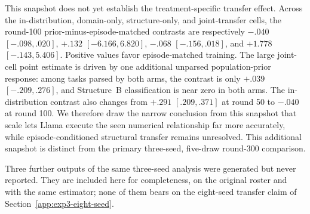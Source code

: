 This snapshot does not yet establish the treatment-specific transfer effect.
Across the in-distribution, domain-only, structure-only, and joint-transfer
cells, the round-100 prior-minus-episode-matched contrasts are respectively
$-.040$ $[-.098,.020]$, $+.132$ $[-6.166,6.820]$, $-.068$
$[-.156,.018]$, and $+1.778$ $[-.143,5.406]$. Positive values favor
episode-matched training. The large joint-cell point estimate is driven by one
additional unparsed population-prior response: among tasks parsed by both arms,
the contrast is only $+.039$ $[-.209,.276]$, and Structure~B classification is
near zero in both arms. The in-distribution contrast also changes from $+.291$
$[.209,.371]$ at round 50 to $-.040$ at round 100. We therefore draw the
narrow conclusion from this snapshot that scale lets Llama execute the seen numerical
relationship far more accurately, while episode-conditioned structural
transfer remains unresolved. This additional snapshot is distinct from
the primary three-seed, five-draw round-300 comparison.

\begin{center}
\begin{minipage}{\linewidth}
\centering
{}
\label{tab:exp3-coin-complete-roster}
\scriptsize
\setlength{\tabcolsep}{3pt}
\resizebox{\linewidth}{!}{}
\end{minipage}
\end{center}

Three further outputs of the same three-seed analysis were generated but never
reported. They are included here for completeness, on the original roster and
with the same estimator; none of them bears on the eight-seed transfer claim of
Section~\ref{app:exp3-eight-seed}.



\begin{center}
\begin{minipage}{\linewidth}
\centering
{}
\label{tab:exp3-coin-qwen4b-cells}
\scriptsize
\setlength{\tabcolsep}{3pt}
\resizebox{\linewidth}{!}{}
\end{minipage}
\end{center}

